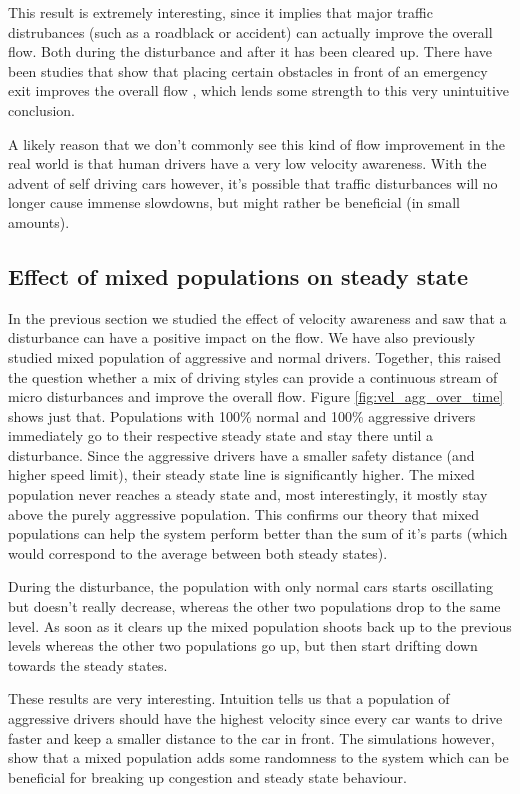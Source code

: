 \documentclass[11pt,a4paper,twocolumn]{article}
\begin{document}
This result is extremely interesting, since it implies that major traffic distrubances (such as a roadblack or accident) can actually improve the overall flow. Both during the disturbance and after it has been cleared up.
There have been studies that show that placing certain obstacles in front of an emergency exit improves the overall flow \cite{yanagisawa2009obstacle}, which lends some strength to this very unintuitive conclusion.

A likely reason that we don't commonly see this kind of flow improvement in the real world is that human drivers have a very low velocity awareness. With the advent of self driving cars however, it's possible that traffic disturbances  will no longer cause immense slowdowns, but might rather be beneficial (in small amounts).

\subsection{Effect of mixed populations on steady state}
In the previous section we studied the effect of velocity awareness and saw that a disturbance can have a positive impact on the flow. We have also previously studied mixed population of aggressive and normal drivers. Together, this raised the question whether a mix of driving styles can provide a continuous stream of micro disturbances and improve the overall flow. Figure \ref{fig:vel_agg_over_time} shows just that.
Populations with 100\% normal and 100\% aggressive drivers immediately go to their respective steady state and stay there until a disturbance. Since the aggressive drivers have a smaller safety distance (and higher speed limit), their steady state line is significantly higher. The mixed population never reaches a steady state and, most interestingly, it mostly stay above the purely aggressive population. This confirms our theory that mixed populations can help the system perform better than the sum of it's parts (which would correspond to the average between both steady states).

During the disturbance, the population with only normal cars starts oscillating but doesn't really decrease, whereas the other two populations drop to the same level. As soon as it clears up the mixed population shoots back up to the previous levels whereas the other two populations go up, but then start drifting down towards the steady states.

These results are very interesting. Intuition tells us that a population of aggressive drivers should have the highest velocity since every car wants to drive faster and keep a smaller distance to the car in front. The simulations however, show that a mixed population adds some randomness to the system which can be beneficial for breaking up congestion and steady state behaviour.
\end{document}
